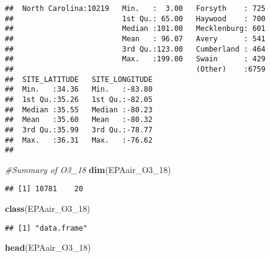 \documentclass[]{article}
\newenvironment{Shaded}{\begin{snugshade}}{\end{snugshade}}
\newcommand{\KeywordTok}[1]{\textcolor[rgb]{0.13,0.29,0.53}{\textbf{#1}}}
\newcommand{\DecValTok}[1]{\textcolor[rgb]{0.00,0.00,0.81}{#1}}
\newcommand{\CommentTok}[1]{\textcolor[rgb]{0.56,0.35,0.01}{\textit{#1}}}
\newcommand{\NormalTok}[1]{#1}
\begin{document}
\begin{verbatim}
##  North Carolina:10219   Min.   :  3.00   Forsyth    : 725  
##                         1st Qu.: 65.00   Haywood    : 700  
##                         Median :101.00   Mecklenburg: 601  
##                         Mean   : 96.07   Avery      : 541  
##                         3rd Qu.:123.00   Cumberland : 464  
##                         Max.   :199.00   Swain      : 429  
##                                          (Other)    :6759  
##  SITE_LATITUDE   SITE_LONGITUDE  
##  Min.   :34.36   Min.   :-83.80  
##  1st Qu.:35.26   1st Qu.:-82.05  
##  Median :35.55   Median :-80.23  
##  Mean   :35.60   Mean   :-80.32  
##  3rd Qu.:35.99   3rd Qu.:-78.77  
##  Max.   :36.31   Max.   :-76.62  
## 
\end{verbatim}

\begin{Shaded}
\begin{Highlighting}[]
\CommentTok{#Summary of O3_18}
\KeywordTok{dim}\NormalTok{(EPAair_O3_}\DecValTok{18}\NormalTok{)}
\end{Highlighting}
\end{Shaded}

\begin{verbatim}
## [1] 10781    20
\end{verbatim}

\begin{Shaded}
\begin{Highlighting}[]
\KeywordTok{class}\NormalTok{(EPAair_O3_}\DecValTok{18}\NormalTok{)}
\end{Highlighting}
\end{Shaded}

\begin{verbatim}
## [1] "data.frame"
\end{verbatim}

\begin{Shaded}
\begin{Highlighting}[]
\KeywordTok{head}\NormalTok{(EPAair_O3_}\DecValTok{18}\NormalTok{)}
\end{Highlighting}
\end{Shaded}
\end{document}
